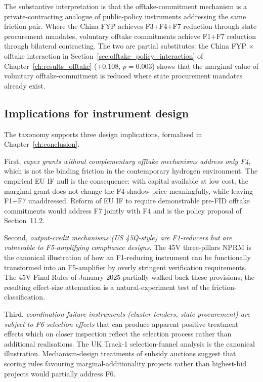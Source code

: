 The substantive interpretation is that the offtake-commitment mechanism is a private-contracting analogue of public-policy instruments addressing the same friction pair. Where the China FYP achieves F3+F4+F7 reduction through state procurement mandates, voluntary offtake commitments achieve F1+F7 reduction through bilateral contracting. The two are partial substitutes: the China FYP $\times$ offtake interaction in Section~\ref{sec:offtake_policy_interaction} of Chapter~\ref{ch:results_offtake} ($+0.108$, $p = 0.003$) shows that the marginal value of voluntary offtake-commitment is reduced where state procurement mandates already exist.

\subsection{Implications for instrument design}
\label{sec:ch3-design-implications}

The taxonomy supports three design implications, formalised in Chapter~\ref{ch:conclusion}.

First, \emph{capex grants without complementary offtake mechanisms address only F4}, which is not the binding friction in the contemporary hydrogen environment. The empirical EU IF null is the consequence: with capital available at low cost, the marginal grant does not change the F4-shadow price meaningfully, while leaving F1+F7 unaddressed. Reform of EU IF to require demonstrable pre-FID offtake commitments would address F7 jointly with F4 and is the policy proposal of Section~11.2.

Second, \emph{output-credit mechanisms (US 45Q-style) are F1-reducers but are vulnerable to F5-amplifying compliance designs}. The 45V three-pillars NPRM is the canonical illustration of how an F1-reducing instrument can be functionally transformed into an F5-amplifier by overly stringent verification requirements. The 45V Final Rules of January 2025 partially walked back these provisions; the resulting effect-size attenuation is a natural-experiment test of the friction-classification.

Third, \emph{coordination-failure instruments (cluster tenders, state procurement) are subject to F6 selection effects} that can produce apparent positive treatment effects which on closer inspection reflect the selection process rather than additional realisations. The UK Track-1 selection-funnel analysis is the canonical illustration. Mechanism-design treatments of subsidy auctions \cite{laffont1993theory, myerson1981optimal} suggest that scoring rules favouring marginal-additionality projects rather than highest-bid projects would partially address F6.

